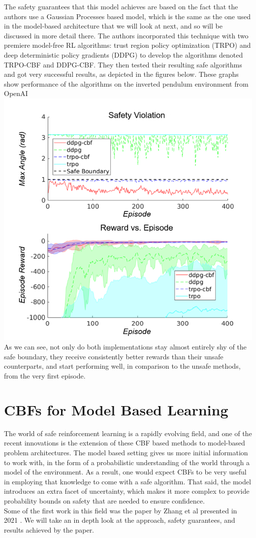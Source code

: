 \documentclass{article}
\begin{document}
The safety guarantees that this model achieves are based on the fact that the authors use a Gaussian Processes based model, which is the same as the one used in the model-based architecture that we will look at next, and so will be discussed in more detail there. The authors incorporated this technique with two premiere model-free RL algorithms: trust region policy optimization (TRPO) \cite{schulman2015trust} and deep deterministic policy gradients (DDPG) \cite{lillicrap2015continuous} to develop the algorithms denoted TRPO-CBF and DDPG-CBF. They then tested their resulting safe algorithms and got very successful results, as depicted in the figures below. These graphs show performance of the algorithms on the inverted pendulum environment from OpenAI \\
\includegraphics[scale = 0.9]{Screenshot 2023-05-13 200345.png}
As we can see, not only do both implementations stay almost entirely shy of the safe boundary, they receive consistently better rewards than their unsafe counterparts, and start performing well, in comparison to the unsafe methods, from the very first episode.
\section{CBFs for Model Based Learning}
The world of safe reinforcement learning is a rapidly evolving field, and one of the recent innovations is the extension of these CBF based methods to model-based problem architectures. The model based setting gives us more initial information to work with, in the form of a probabilistic understanding of the world through a model of the environment. As a result, one would expect CBFs to be very useful in employing that knowledge to come with a safe algorithm. That said, the model introduces an extra facet of uncertainty, which makes it more complex to provide probability bounds on safety that are needed to ensure confidence.\\
Some of the first work in this field was the paper by Zhang et al presented in 2021 \cite{zhang2021model}. We will take an in depth look at the approach, safety guarantees, and results achieved by the paper. 
\end{document}
